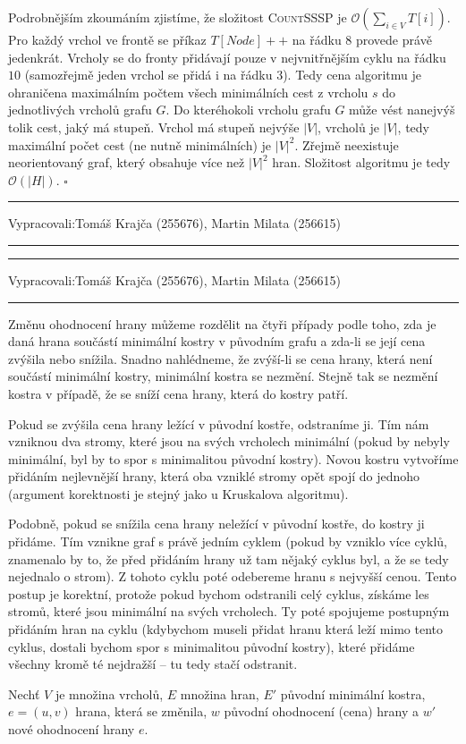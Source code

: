 \documentclass[12pt]{article}
\renewcommand{\O}{\mathcal{O}}
\newcommand{\zadani}[2]{
{\large
\noindent {\bf IB108 \hfill{} Sada #1, Příklad #2 \\[-4mm]}
\noindent\hrule
\vspace{2mm}
\noindent Vypracovali:\hfill{}Tomáš Krajča (255676), Martin Milata (256615)
\vspace{3mm}
\hrule
\bigskip\bigskip}
}
\begin{document}
\noindent
Podrobnějším zkoumáním zjistíme, že složitost \textsc{CountSSSP} je
$\O\left(\sum_{i\in V} T[i]\right)$. Pro každý vrchol ve frontě se příkaz
$T[Node]++$ na řádku $8$ provede právě jedenkrát. Vrcholy se do fronty přidávají
pouze v nejvnitřnějším cyklu na řádku $10$ (samozřejmě jeden vrchol se přidá i
na řádku $3$). Tedy cena algoritmu je ohraničena maximálním počtem všech
minimálních cest z vrcholu $s$ do jednotlivých vrcholů grafu $G$. Do kteréhokoli
vrcholu grafu $G$ může vést nanejvýš tolik cest, jaký má stupeň. Vrchol má stupeň
nejvýše $|V|$, vrcholů je $|V|$, tedy maximální počet cest (ne nutně
minimálních) je $|V|^2$. Zřejmě neexistuje neorientovaný graf, který obsahuje
více než $|V|^2$ hran. Složitost algoritmu je tedy $\O(|H|)$.
\hfill$\square$

\clearpage
\zadani{3}{3}

\clearpage
\zadani{3}{4}

\noindent
Změnu ohodnocení hrany můžeme rozdělit na čtyři případy podle toho, zda je daná hrana součástí
minimální kostry v původním grafu a zda-li se její cena zvýšila nebo snížila.  Snadno nahlédneme, že
zvýší-li se cena hrany, která není součástí minimální kostry, minimální kostra se nezmění. Stejně
tak se nezmění kostra v případě, že se sníží cena hrany, která do kostry patří.

Pokud se zvýšila cena hrany ležící v původní kostře, odstraníme ji. Tím nám vzniknou dva stromy,
které jsou na svých vrcholech minimální
(pokud by nebyly minimální, byl by to spor s minimalitou původní kostry). Novou kostru
vytvoříme přidáním nejlevnější hrany, která oba vzniklé stromy opět spojí do jednoho (argument
korektnosti je stejný jako u Kruskalova algoritmu).

Podobně, pokud se snížila cena hrany neležící v původní kostře, do kostry ji přidáme. Tím vznikne graf
s právě jedním cyklem (pokud by vzniklo více cyklů, znamenalo by to, že před přidáním hrany už tam nějaký
cyklus byl, a že se tedy nejednalo o strom). Z tohoto cyklu poté odebereme hranu s nejvyšší cenou. Tento
postup je korektní, protože pokud bychom odstranili celý cyklus, získáme les stromů, které jsou
minimální na svých vrcholech.
Ty poté spojujeme postupným přidáním hran na cyklu (kdybychom museli přidat hranu která leží mimo
tento cyklus, dostali bychom spor s minimalitou původní kostry), které přidáme všechny kromě té nejdražší
-- tu tedy stačí odstranit.

Nechť $V$ je množina vrcholů, $E$ množina hran, $E'$ původní minimální kostra, $e=(u,v)$ hrana, která
se změnila, $w$ původní ohodnocení (cena) hrany a $w'$ nové ohodnocení hrany $e$.
\end{document}
